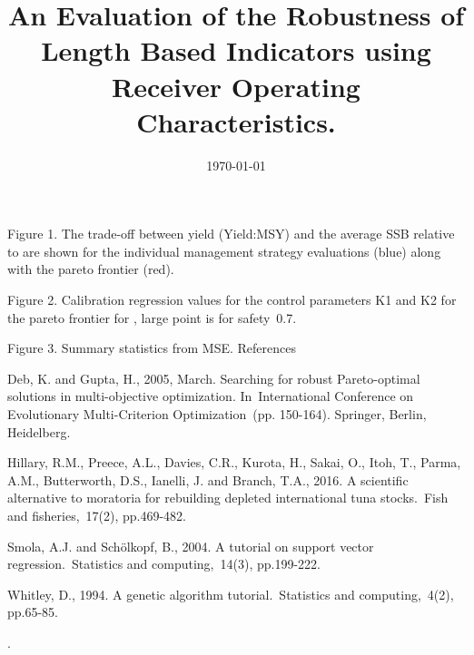 \documentclass[12pt,doublespacing,a4paper]{ouparticle}
\begin{document}
Figure 1. The trade-off between yield (Yield:MSY) and the average SSB relative to  are shown for the individual management strategy evaluations (blue) along with the pareto frontier (red).

Figure 2. Calibration regression values for the control parameters K1 and K2 for the pareto frontier for , large point is for safety~0.7.


Figure 3. Summary statistics from MSE.
References

Deb, K. and Gupta, H., 2005, March. Searching for robust Pareto-optimal solutions in multi-objective optimization. In International Conference on Evolutionary Multi-Criterion Optimization (pp. 150-164). Springer, Berlin, Heidelberg.

Hillary, R.M., Preece, A.L., Davies, C.R., Kurota, H., Sakai, O., Itoh, T., Parma, A.M., Butterworth, D.S., Ianelli, J. and Branch, T.A., 2016. A scientific alternative to moratoria for rebuilding depleted international tuna stocks. Fish and fisheries, 17(2), pp.469-482.

Smola, A.J. and Schölkopf, B., 2004. A tutorial on support vector regression. Statistics and computing, 14(3), pp.199-222.

Whitley, D., 1994. A genetic algorithm tutorial. Statistics and computing, 4(2), pp.65-85.

.

\title{An Evaluation of the Robustness of Length Based Indicators using Receiver Operating Characteristics.}

\author{%
\address{Centre for Environmental Policy, Imperial College London, London SW7 1NE}
\and
{}
\address{GMIT}
\address{Marine Institute}
}

\abstract{
}

\date{\today}

\keywords{}
 
\maketitle
\end{document}
